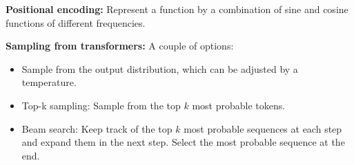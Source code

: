 \documentclass[12pt]{article}
\begin{document}
\textbf{Positional encoding:} Represent a function by a combination of sine and cosine functions of different frequencies.

\textbf{Sampling from transformers:} A couple of options:
\begin{itemize}
    \item Sample from the output distribution, which can be adjusted by a temperature.
    \item Top-k sampling: Sample from the top $k$ most probable tokens.
    \item Beam search: Keep track of the top $k$ most probable sequences at each step and expand them in the next step. Select the most probable sequence at the end.
\end{itemize}
\end{document}
